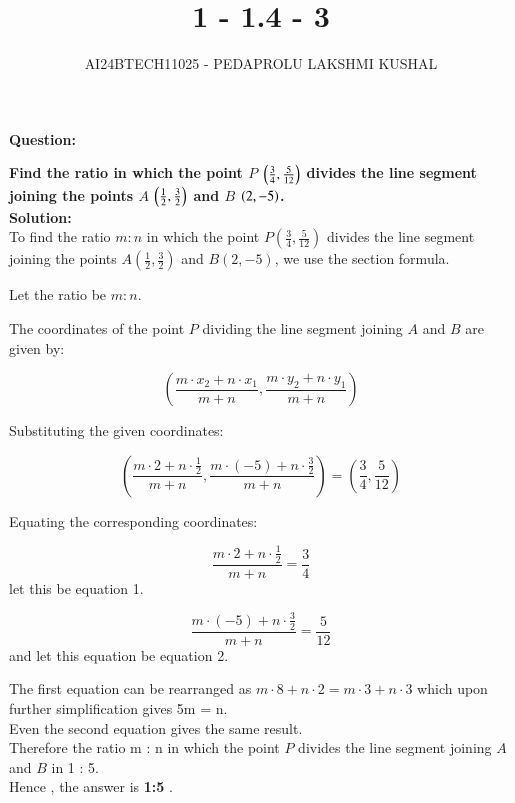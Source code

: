 \documentclass[journal]{IEEEtran}
\begin{document}

\vspace{3cm}

\title{1 - 1.4 - 3}
\author{AI24BTECH11025 - PEDAPROLU LAKSHMI KUSHAL
}
{\let\newpage\relax\maketitle}

\renewcommand{\thefigure}{\theenumi}
\renewcommand{\thetable}{\theenumi}
\setlength{\intextsep}{10pt} %


\renewcommand{\thetable}{\theenumi}


\textbf{Question:}

\textbf{Find the ratio in which the point \(P \) $\left(\frac{3}{4}, \frac{5}{12} \right)$ divides the line segment joining the points \(A \) $\left(\frac{1}{2},\frac{3}{2}\right)$ and \(B \) $\left(2,-5\right)$.}
\\

\textbf{Solution:}\\
To find the ratio \( m : n \) in which the point \( P\left(\frac{3}{4}, \frac{5}{12}\right) \) divides the line segment joining the points \( A\left(\frac{1}{2}, \frac{3}{2}\right) \) and \( B(2, -5) \), we use the section formula.

Let the ratio be \( m : n \).

The coordinates of the point \( P \) dividing the line segment joining \( A \) and \( B \) are given by:

\[
\left( \frac{m \cdot x_2 + n \cdot x_1}{m+n}, \frac{m \cdot y_2 + n \cdot y_1}{m+n} \right)
\]

Substituting the given coordinates:

\[
\left( \frac{m \cdot 2 + n \cdot \frac{1}{2}}{m+n}, \frac{m \cdot (-5) + n \cdot \frac{3}{2}}{m+n} \right) = \left(\frac{3}{4}, \frac{5}{12}\right)
\]

Equating the corresponding coordinates:

\[
\frac{m \cdot 2 + n \cdot \frac{1}{2}}{m+n} = \frac{3}{4}
\] let this be equation 1.

\[
\frac{m \cdot (-5) + n \cdot \frac{3}{2}}{m+n} = \frac{5}{12}
\] and let this equation be equation 2.

The first equation can be rearranged as $ m\cdot8 + n\cdot2 = m\cdot3 + n\cdot3 $ which upon further simplification gives 5m = n.\\
Even the second equation gives the same result.\\
Therefore the ratio m : n in which the point \(P \) divides the line segment joining \(A\) and \(B\) in 1 : 5.\\
Hence , the answer is \textbf{1:5} .
\end{document}
